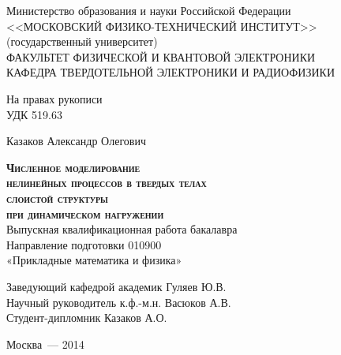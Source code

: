 \begin{titlepage}
\newpage

\begin{center}
	Министерство образования и науки Российской Федерации \\
	<<МОСКОВСКИЙ ФИЗИКО-ТЕХНИЧЕСКИЙ ИНСТИТУТ>>\\(государственный университет)\\[0.5cm]
	ФАКУЛЬТЕТ ФИЗИЧЕСКОЙ И КВАНТОВОЙ ЭЛЕКТРОНИКИ\\
	КАФЕДРА ТВЕРДОТЕЛЬНОЙ ЭЛЕКТРОНИКИ И РАДИОФИЗИКИ\\
\end{center}

\vspace{0.5em}

\begin{flushright}
На правах рукописи \\
УДК 519.63
\end{flushright}

\vspace{1em}

\begin{center}
	Казаков Александр Олегович
\end{center}

\vspace{0.5em}

\begin{center}
	\textsc{\textbf{Численное моделирование\\ 
		нелинейных процессов в твердых телах \\
		слоистой структуры\\
		при динамическом нагружении}}\\[1cm]
	Выпускная квалификационная работа бакалавра\\
	Направление подготовки 010900\\
	«Прикладные математика и физика»\\
\end{center}

\vspace{2em}

\begin{flushleft}
	Заведующий кафедрой \hrulefill академик Гуляев Ю.В.\\[0.5cm]
	Научный руководитель \hrulefill к.ф.-м.н. Васюков А.В.\\[0.5cm]
	Студент-дипломник \hrulefill Казаков А.О.\\
\end{flushleft}

\vspace{\fill}
\begin{center}
Москва~--- 2014
\end{center}

\end{titlepage}
